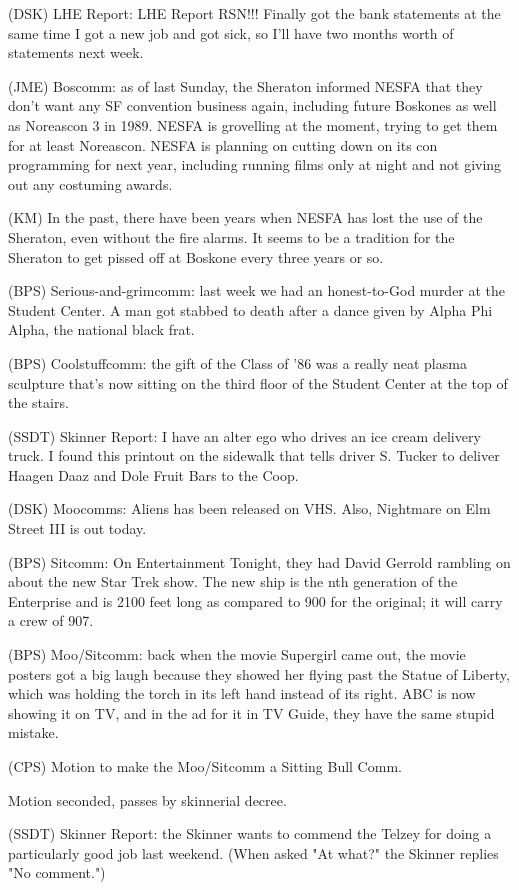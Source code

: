 \documentclass[12pt]{article}
\begin{document}
(DSK) LHE Report: LHE Report RSN!!! Finally got the bank statements at the same time I got a new job and got sick, so I'll have two months worth of statements next week.

(JME) Boscomm: as of last Sunday, the Sheraton informed NESFA that they don't want any SF convention business again, including future Boskones as well as Noreascon 3 in 1989. NESFA is grovelling at the moment, trying to get them for at least Noreascon. NESFA is planning on cutting down on its con programming for next year, including running films only at night and not giving out any costuming awards.

(KM) In the past, there have been years when NESFA has lost the use of the Sheraton, even without the fire alarms. It seems to be a tradition for the Sheraton to get pissed off at Boskone every three years or so.

(BPS) Serious-and-grimcomm: last week we had an honest-to-God murder at the Student Center. A man got stabbed to death after a dance given by Alpha Phi Alpha, the national black frat.

(BPS) Coolstuffcomm: the gift of the Class of '86 was a really neat plasma sculpture that's now sitting on the third floor of the Student Center at the top of the stairs.

(SSDT) Skinner Report: I have an alter ego who drives an ice cream delivery truck. I found this printout on the sidewalk that tells driver S. Tucker to deliver Haagen Daaz and Dole Fruit Bars to the Coop.

(DSK) Moocomms: Aliens has been released on VHS. Also, Nightmare on Elm Street III is out today.

(BPS) Sitcomm: On Entertainment Tonight, they had David Gerrold rambling on about the new Star Trek show. The new ship is the nth generation of the Enterprise and is 2100 feet long as compared to 900 for the original; it will carry a crew of 907.

(BPS) Moo/Sitcomm: back when the movie Supergirl came out, the movie posters got a big laugh because they showed her flying past the Statue of Liberty, which was holding the torch in its left hand instead of its right. ABC is now showing it on TV, and in the ad for it in TV Guide, they have the same stupid mistake.

(CPS) Motion to make the Moo/Sitcomm a Sitting Bull Comm.

Motion seconded, passes by skinnerial decree.

(SSDT) Skinner Report: the Skinner wants to commend the Telzey for doing a particularly good job last weekend. (When asked "At what?" the Skinner replies "No comment.")
\end{document}
